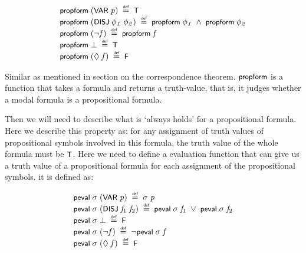 \documentclass{report}
\renewcommand{\HOLConst}[1]{{\textsf{\upshape\small #1}}}
\renewcommand{\HOLinline}[1]{\ensuremath{#1}}
\newenvironment{holmath}{\begin{displaymath}\begin{array}{l}}{\end{array}\end{displaymath}\ignorespacesafterend}
\begin{document}
\begin{holmath}
  \HOLConst{propform}\;(\HOLConst{VAR}\;\HOLFreeVar{p})\;\HOLSymConst{\HOLTokenDefEquality{}}\;\HOLConst{T}\\
\HOLConst{propform}\;(\HOLConst{DISJ}\;\HOLFreeVar{\ensuremath{\phi\sb{1}}}\;\HOLFreeVar{\ensuremath{\phi\sb{2}}})\;\HOLSymConst{\HOLTokenDefEquality{}}\;\HOLConst{propform}\;\HOLFreeVar{\ensuremath{\phi\sb{1}}}\;\HOLSymConst{\HOLTokenConj{}}\;\HOLConst{propform}\;\HOLFreeVar{\ensuremath{\phi\sb{2}}}\\
\HOLConst{propform}\;(\HOLSymConst{\HOLTokenNeg{}}\HOLFreeVar{f})\;\HOLSymConst{\HOLTokenDefEquality{}}\;\HOLConst{propform}\;\HOLFreeVar{f}\\
\HOLConst{propform}\;\HOLSymConst{\ensuremath{\bot}}\;\HOLSymConst{\HOLTokenDefEquality{}}\;\HOLConst{T}\\
\HOLConst{propform}\;(\HOLSymConst{\ensuremath{\Diamond}}\;\HOLFreeVar{f})\;\HOLSymConst{\HOLTokenDefEquality{}}\;\HOLConst{F}
\end{holmath}

Similar as mentioned in section on the correspondence theorem. \HOLinline{\HOLConst{propform}} is a function that takes a formula and returns a truth-value, that is, it judges whether a modal formula is a propositional formula.

Then we will need to describe what is `always holds' for a propositional formula. Here we describe this property as: for any assignment of truth values of propositional symbols involved in this formula, the truth value of the whole formula must be \HOLinline{\HOLConst{T}}. Here we need to define a evaluation function that can give us a truth value of a propositional formula for each assignment of the propositional symbols. it is defined as:

\begin{holmath}
  \HOLConst{peval}\;\HOLFreeVar{\ensuremath{\sigma}}\;(\HOLConst{VAR}\;\HOLFreeVar{p})\;\HOLSymConst{\HOLTokenDefEquality{}}\;\HOLFreeVar{\ensuremath{\sigma}}\;\HOLFreeVar{p}\\
\HOLConst{peval}\;\HOLFreeVar{\ensuremath{\sigma}}\;(\HOLConst{DISJ}\;\HOLFreeVar{f\sb{\mathrm{1}}}\;\HOLFreeVar{f\sb{\mathrm{2}}})\;\HOLSymConst{\HOLTokenDefEquality{}}\;\HOLConst{peval}\;\HOLFreeVar{\ensuremath{\sigma}}\;\HOLFreeVar{f\sb{\mathrm{1}}}\;\HOLSymConst{\HOLTokenDisj{}}\;\HOLConst{peval}\;\HOLFreeVar{\ensuremath{\sigma}}\;\HOLFreeVar{f\sb{\mathrm{2}}}\\
\HOLConst{peval}\;\HOLFreeVar{\ensuremath{\sigma}}\;\HOLSymConst{\ensuremath{\bot}}\;\HOLSymConst{\HOLTokenDefEquality{}}\;\HOLConst{F}\\
\HOLConst{peval}\;\HOLFreeVar{\ensuremath{\sigma}}\;(\HOLSymConst{\HOLTokenNeg{}}\HOLFreeVar{f})\;\HOLSymConst{\HOLTokenDefEquality{}}\;\HOLSymConst{\HOLTokenNeg{}}\HOLConst{peval}\;\HOLFreeVar{\ensuremath{\sigma}}\;\HOLFreeVar{f}\\
\HOLConst{peval}\;\HOLFreeVar{\ensuremath{\sigma}}\;(\HOLSymConst{\ensuremath{\Diamond}}\;\HOLFreeVar{f})\;\HOLSymConst{\HOLTokenDefEquality{}}\;\HOLConst{F}
\end{holmath}
\end{document}
